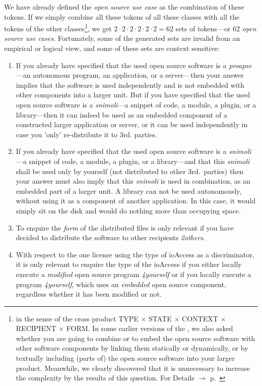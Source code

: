 We have already defined the \emph{open source use case} as the combination of
these tokens. If we simply combine all these tokens of all these classes with
all the tokens of the other classes\footnote{in the sense of the cross product
TYPE $\times$ STATE $\times$ CONTEXT $\times$ RECIPIENT $\times$ FORM. In some
earlier versions of the \oslic{}, we also asked whether you are going to combine
or to embed the open source software with other software components by linking
them statically or dynamically, or by textually including (parts of) the open
source software into your larger product. Meanwhile, we clearly discovered that
it is unnecessary to increase the complexity by the results of this question.
For Details $\rightarrow$ \oslic{} p.\ \pageref{sec:LinkingSecondary}}, we get
$2 \cdot 2 \cdot 2 \cdot 2 \cdot 2 \cdot 2 = 62$ sets of tokens---or 62
\emph{open source use cases}. Fortunately, some of the generated sets are
invalid from an empirical or logical view, and some of these sets are context
sensitive:

\begin{enumerate}
  \label{InvalidFinderTokenCombinations}
  \item If you already have specified that the used open source software is a
  \emph{proapse}---an autonomous program, an application, or a server---then
  your answer implies that the software is used independently and is not
  embedded with other components into a larger unit. But if you have specified
  that the used open source software is a \emph{snimoli}---a snippet of
  code, a module, a plugin, or a library---then it can indeed be used as an
  embedded component of a constructed larger application or server, or it can be
  used independently in case you 'only' re-distribute it to 3rd. parties.
  
  \item If you already have specified that the used open source software is a
  \emph{snimoli}---a snippet of code, a module, a plugin, or a library---and
  that this \emph{snimoli} shall be used only by yourself (not distributed to
  other 3rd.\ parties) then your answer must also imply that this \emph{snimoli}
  is used in combination, as an embedded part of a larger unit. A library can
  not be used autonomously, without using it as a component of another
  application. In this case, it would simply sit on the disk and would do
  nothing more than occupying space.
  
  \item To enquire the \emph{form} of the distributed files is only relevant if
  you have decided to distribute the software to other recipients
  \emph{2others}.
  
  \item With respect to the one license using the type of ioAccess as a
  discriminator, it is only relevant to enquire the type of the ioAccess if you
  either locally execute a \emph{modified} open source program \emph{4yourself}
  or if you locally execute a program \emph{4yourself}, which uses an
  \emph{embedded} open source component, regardless whether it has been modified
  or not.
  
\end{enumerate}


